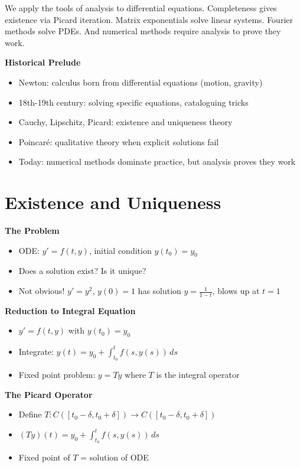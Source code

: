 \documentclass[
  10pt,
  letterpaper,
]{scrbook}
\providecommand{\tightlist}{%
  \setlength{\itemsep}{0pt}\setlength{\parskip}{0pt}}
\begin{document}
We apply the tools of analysis to differential equations. Completeness
gives existence via Picard iteration. Matrix exponentials solve linear
systems. Fourier methods solve PDEs. And numerical methods require
analysis to prove they work.

\textbf{Historical Prelude}

\begin{itemize}
\tightlist
\item
  Newton: calculus born from differential equations (motion, gravity)
\item
  18th-19th century: solving specific equations, cataloguing tricks
\item
  Cauchy, Lipschitz, Picard: existence and uniqueness theory
\item
  Poincaré: qualitative theory when explicit solutions fail
\item
  Today: numerical methods dominate practice, but analysis proves they
  work
\end{itemize}

\section{Existence and Uniqueness}\label{existence-and-uniqueness}

\textbf{The Problem}

\begin{itemize}
\tightlist
\item
  ODE: \(y' = f(t, y)\), initial condition \(y(t_0) = y_0\)
\item
  Does a solution exist? Is it unique?
\item
  Not obvious! \(y' = y^2\), \(y(0) = 1\) has solution
  \(y = \frac{1}{1-t}\), blows up at \(t = 1\)
\end{itemize}

\textbf{Reduction to Integral Equation}

\begin{itemize}
\tightlist
\item
  \(y' = f(t, y)\) with \(y(t_0) = y_0\)
\item
  Integrate: \(y(t) = y_0 + \int_{t_0}^t f(s, y(s))\, ds\)
\item
  Fixed point problem: \(y = Ty\) where \(T\) is the integral operator
\end{itemize}

\textbf{The Picard Operator}

\begin{itemize}
\tightlist
\item
  Define
  \(T: C([t_0 - \delta, t_0 + \delta]) \to C([t_0 - \delta, t_0 + \delta])\)
\item
  \((Ty)(t) = y_0 + \int_{t_0}^t f(s, y(s))\, ds\)
\item
  Fixed point of \(T\) = solution of ODE
\end{itemize}
\end{document}
